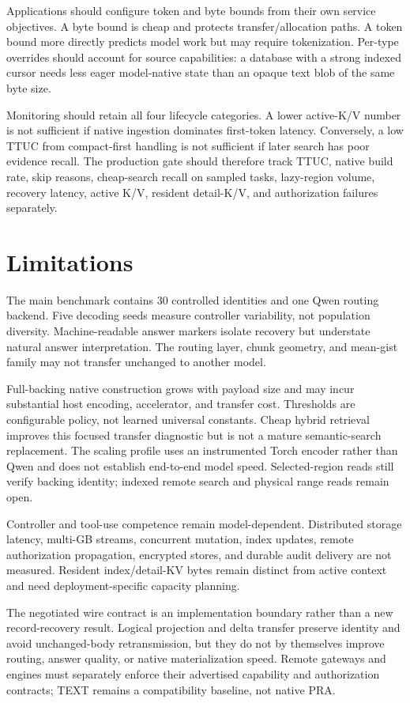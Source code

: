 \documentclass[11pt]{article}
\begin{document}
Applications should configure token and byte bounds from their own service
objectives. A byte bound is cheap and protects transfer/allocation paths. A
token bound more directly predicts model work but may require tokenization.
Per-type overrides should account for source capabilities: a database with a
strong indexed cursor needs less eager model-native state than an opaque text
blob of the same byte size.

Monitoring should retain all four lifecycle categories. A lower active-K/V
number is not sufficient if native ingestion dominates first-token latency.
Conversely, a low TTUC from compact-first handling is not sufficient if later
search has poor evidence recall. The production gate should therefore track
TTUC, native build rate, skip reasons, cheap-search recall on sampled tasks,
lazy-region volume, recovery latency, active K/V, resident detail-K/V, and
authorization failures separately.

\section{Limitations}

The main benchmark contains 30 controlled identities and one Qwen routing
backend. Five decoding seeds measure controller variability, not population
diversity. Machine-readable answer markers isolate recovery but understate
natural answer interpretation. The routing layer, chunk geometry, and
mean-gist family may not transfer unchanged to another model.

Full-backing native construction grows with payload size and may incur
substantial host encoding, accelerator, and transfer cost. Thresholds are
configurable policy, not learned universal constants. Cheap hybrid retrieval
improves this focused transfer diagnostic but is not a mature semantic-search
replacement. The scaling profile uses an instrumented
Torch encoder rather than Qwen and does not establish end-to-end model speed.
Selected-region reads still verify backing identity; indexed remote search and
physical range reads remain open.

Controller and tool-use competence remain model-dependent. Distributed storage
latency, multi-GB streams, concurrent mutation, index updates, remote
authorization propagation, encrypted stores, and durable audit delivery are
not measured. Resident index/detail-KV bytes remain distinct from active
context and need deployment-specific capacity planning.

The negotiated wire contract is an implementation boundary rather than a new
record-recovery result. Logical projection and delta transfer preserve identity
and avoid unchanged-body retransmission, but they do not by themselves improve
routing, answer quality, or native materialization speed. Remote gateways and
engines must separately enforce their advertised capability and authorization
contracts; TEXT remains a compatibility baseline, not native PRA.
\end{document}
